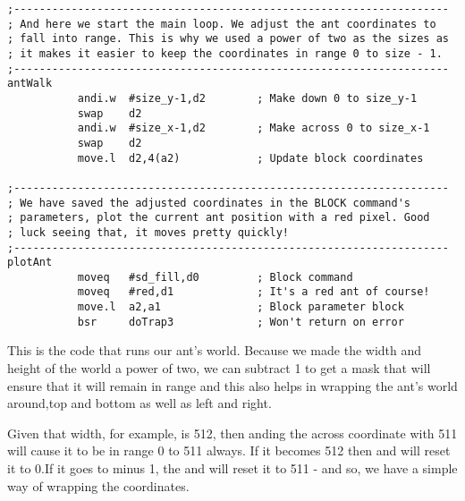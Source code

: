 \begin{lstlisting}[firstnumber=last,caption={Langtons Ant - Start of Loop}]
;--------------------------------------------------------------------
; And here we start the main loop. We adjust the ant coordinates to
; fall into range. This is why we used a power of two as the sizes as
; it makes it easier to keep the coordinates in range 0 to size - 1.
;--------------------------------------------------------------------
antWalk
           andi.w  #size_y-1,d2        ; Make down 0 to size_y-1
           swap    d2
           andi.w  #size_x-1,d2        ; Make across 0 to size_x-1
           swap    d2
           move.l  d2,4(a2)            ; Update block coordinates

;--------------------------------------------------------------------
; We have saved the adjusted coordinates in the BLOCK command's 
; parameters, plot the current ant position with a red pixel. Good
; luck seeing that, it moves pretty quickly!
;--------------------------------------------------------------------
plotAnt
           moveq   #sd_fill,d0         ; Block command
           moveq   #red,d1             ; It's a red ant of course!
           move.l  a2,a1               ; Block parameter block
           bsr     doTrap3             ; Won't return on error

\end{lstlisting}

This is the code that runs our ant's world. Because we made the width and height of the world a power of two, we can subtract 1 to get a mask that will ensure that it will remain in range and this also helps in wrapping the ant's world around,top and bottom as well as left and right. 

Given that width, for example, is 512, then anding the across coordinate with 511 will cause it to be in range 0 to 511 always. If it becomes 512 then and will reset it to 0.If it goes to minus 1, the and will reset it to 511 - and so, we have a simple way of wrapping the coordinates.

